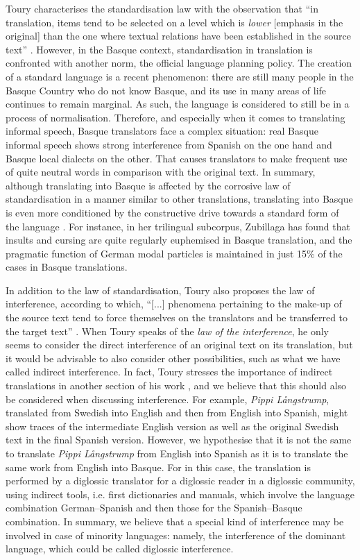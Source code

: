 \documentclass[output=paper]{LSP/langsci}
\begin{document}
Toury characterises the standardisation law with the observation that “in translation, items tend to be selected on a level which is \emph{lower} [emphasis in the original] than the one where textual relations have been established in the source text” \citep[305]{Toury2012}. However, in the Basque context, standardisation in translation is confronted with another norm, the official language planning policy. The creation of a standard language is a recent phenomenon: there are still many people in the Basque Country who do not know Basque, and its use in many areas of life continues to remain marginal. As such, the language is considered to still be in a process of normalisation. Therefore, and especially when it comes to translating informal speech, Basque translators face a complex situation: real Basque informal speech shows strong interference from Spanish on the one hand and Basque local dialects on the other. That causes translators to make frequent use of quite neutral words in comparison with the original text. In summary, although translating into Basque is affected by the corrosive law of standardisation in a manner similar to other translations, translating into Basque is even more conditioned by the constructive drive towards a standard form of the language \citep{Barambones2012}. For instance, in her trilingual subcorpus, Zubillaga has found that insults and cursing are quite regularly euphemised in Basque translation, and the pragmatic function of German modal particles is maintained in just 15\% of the cases in Basque translations.

In addition to the law of standardisation, Toury also proposes the law of interference, according to which, “[...] phenomena pertaining to the make-up of the source text tend to force themselves on the translators and be transferred to the target text” \citep[310]{Toury2012}. When Toury speaks of the \textit{law of the interference}, he only seems to consider the direct interference of an original text on its translation, but it would be advisable to also consider other possibilities, such as what we have called indirect interference. In fact, Toury stresses the importance of indirect translations in another section of his work \citep[129--146]{Toury1995}, and we believe that this should also be considered when discussing interference. For example, \textit{Pippi Långstrump}, translated from Swedish into English and then from English into Spanish, might show traces of the intermediate English version as well as the original Swedish text in the final Spanish version. However, we hypothesise that it is not the same to translate \textit{Pippi Långstrump} from English into Spanish as it is to translate the same work from English into Basque. For in this case, the translation is performed by a diglossic translator for a diglossic reader in a diglossic community, using indirect tools, i.e. first dictionaries and manuals, which involve the language combination German--Spanish and then those for the Spanish--Basque combination. In summary, we believe that a special kind of interference may be involved in case of minority languages: namely, the interference of the dominant language, which could be called diglossic interference.
\end{document}
